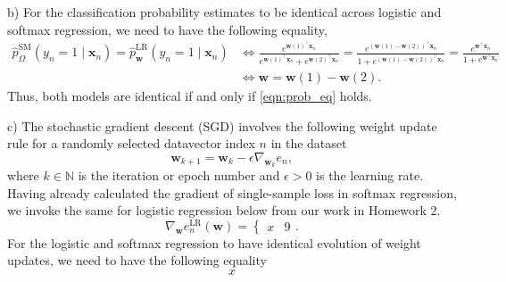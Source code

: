 \documentclass{article}
\newcommand{\N}{\mathbb{N}}
\renewcommand{\vec}[1]{\mathbf{#1}}
\begin{document}
    b) For the classification probability estimates to be identical across
    logistic and softmax regression, we need to have the following equality,
    \begin{align}
        \hat{p}^{\text{SM}}_{\Omega}(y_n=1\mid\vec{x}_n)=\hat{p}^{\text{LR}}
        _{\vec{w}}(y_n=1\mid\vec{x}_n) &\iff \frac{e^{\vec{w}(1)^\top\vec{x}
        _n}}{e^{\vec{w}(1)^\top\vec{x}_n}+e^{\vec{w}(2)^\top\vec{x}_n}} = 
        \frac{e^{\left(\vec{w}(1)-\vec{w}(2)\right)^\top\vec{x}_n}}{1+e^{\left
        (\vec{w}(1)-\vec{w}(2)\right)^\top\vec{x}_n}} = 
        \frac{e^{\vec{w}^\top\vec{x}_n}}{1+e^{\vec{w}^\top\vec{x}_n}}\\
        \label{eqn:prob_eq}
        &\iff \vec{w} = \vec{w}(1) - \vec{w}(2).
    \end{align}
    Thus, both models are identical if and only if \eqref{eqn:prob_eq} holds.

    c) The stochastic gradient descent (SGD) involves the following weight 
    update rule for a randomly selected datavector index $n$ in the dataset
    \begin{equation}
        \vec{w}_{k+1} = \vec{w}_k - \epsilon\nabla_{\vec{w}_k}e_n,
    \end{equation}
    where $k\in\N$ is the iteration or epoch number and $\epsilon>0$ is the 
    learning rate. Having already calculated the gradient of single-sample 
    loss in softmax regression, we invoke the same for logistic regression 
    below from our work in Homework 2.
    \begin{equation}
        \nabla_{\vec{w}}e_n^{\text{LR}}(\vec{w}) = 
        \begin{cases}
            x & 9
        \end{cases}.
    \end{equation}
    For the logistic and softmax regression to have identical
    evolution of weight updates, we need to have the following equality
    \begin{equation*}
        x
    \end{equation*}
\end{document}

